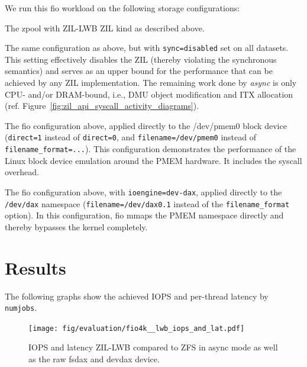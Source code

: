 \documentclass[12pt,a4paper,twoside]{book}
\begin{document}
We run this fio workload on the following storage configurations:
\begin{description}[noitemsep,leftmargin=1.5cm,labelindent=1cm]
    \item[zil-lwb] The zpool with ZIL-LWB ZIL kind as described above.
    \item[async] The same configuration as above, but with \lstinline{sync=disabled} set on all datasets.
        This setting effectively disables the ZIL (thereby violating the synchronous semantics) and serves as an upper bound for the performance that can be achieved by any ZIL implementation.
        The remaining work done by \textit{async} is only CPU- and/or DRAM-bound, i.e.,  DMU object modification and ITX allocation (ref. Figure~\ref{fig:zil_api_syscall_activity_diagrams}).
    \item[fsdax] The fio configuration above, applied directly to the /dev/pmem0 block device (\lstinline{direct=1} instead of \lstinline{direct=0}, and \lstinline{filename=/dev/pmem0} instead of \lstinline{filename_format=...}).
        This configuration demonstrates the performance of the Linux block device emulation around the PMEM hardware. It includes the syscall overhead.
    \item[devdax] The fio configuration above, with \lstinline{ioengine=dev-dax}, applied directly to the \texttt{/dev/dax} namespace (\lstinline{filename=/dev/dax0.1} instead of the \lstinline{filename_format} option).
        In this configuration, fio mmaps the PMEM namespace directly and thereby bypasses the kernel completely.
\end{description}

\section{Results}\label{ch:lwb_analysis:results}

The following graphs show the achieved IOPS and per-thread latency by \lstinline{numjobs}.

\begin{figure}[H]
    \centering
    \texttt{[image: fig/evaluation/fio4k\_\_lwb\_iops\_and\_lat.pdf]}
    \caption{IOPS and latency ZIL-LWB compared to ZFS in async mode as well as the raw fsdax and devdax device.}
    \label{fig:lwbanalysis:iops_and_latency}
\end{figure}
\end{document}
